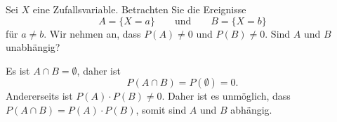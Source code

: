 Sei $X$ eine Zufallsvariable.
Betrachten Sie die Ereignisse
\[
A=\{X=a\}
\qquad\text{und}\qquad
B=\{X=b\}
\]
für $a\ne b$.
Wir nehmen an, dass $P(A)\ne 0$ und $P(B)\ne 0$.
Sind $A$ und $B$ unabhängig?

\begin{loesung}
Es ist $A\cap B=\emptyset$, daher ist
\[
P(A\cap B)
=
P(\emptyset)
=
0.
\]
Andererseits ist $P(A)\cdot P(B)\ne 0$.
Daher ist es unmöglich, dass $P(A\cap B)=P(A)\cdot P(B)$, somit sind
$A$ und $B$ abhängig.
\end{loesung}
